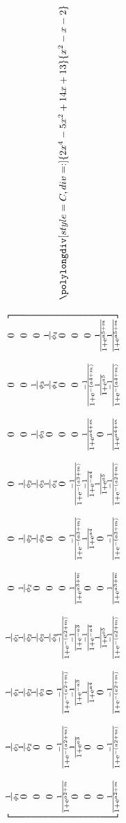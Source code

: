 \documentclass[a4paper,12pt]{article}
\begin{document}
\lipsum[2]

    \begin{equation*}
      \rotatebox{90}{$
        {\polylongdiv[style=C,div=:]{2x^4-5x^2+14x+13}{x^2-x-2}}
      $}
    \end{equation*}

    \begin{equation}
      \rotatebox{90}{$\begin{bmatrix}
          \frac{1}{\phi_1} &
          \frac{1}{\phi_1} &
          \frac{1}{\phi_1} &
          \frac{1}{\phi_1} &
          0 &
          0 &
          0 &
          0 &
          0 &
          0 \\
          0 &
          \frac{1}{\phi_2} &
          \frac{1}{\phi_2} &
          \frac{1}{\phi_2} &
          \frac{1}{\phi_2} &
          \frac{1}{\phi_2} &
          \frac{1}{\phi_2} &
          0 &
          0 &
          0 \\
          0 &
          0 &
          \frac{1}{\phi_3} &
          \frac{1}{\phi_3} &
          0 &
          \frac{1}{\phi_3} &
          \frac{1}{\phi_3} &
          \frac{1}{\phi_3} &
          \frac{1}{\phi_3} &
          0 \\
          0 &
          0 &
          0 &
          \frac{1}{\phi_4} &
          0 &
          0 &
          \frac{1}{\phi_4} &
          0 &
          \frac{1}{\phi_4} &
          \frac{1}{\phi_4} \\
          \frac{1}{1+\mathrm{e}^{a2+m}} &
          \frac{-1}{1+\mathrm{e}^{-(a2+m)}} &
          \frac{-1}{1+\mathrm{e}^{-(a2+m)}} &
          \frac{-1}{1+\mathrm{e}^{-(a2+m)}} &
          0 &
          0 &
          0 &
          0 &
          0 &
          0 \\
          0 &
          \frac{1}{1+\mathrm{e}^{a3}} &
          \frac{-1}{1+\mathrm{e}^{-a3}} &
          \frac{-1}{1+\mathrm{e}^{-a3}} &
          \frac{1}{1+\mathrm{e}^{a3+m}} &
          \frac{-1}{1+\mathrm{e}^{-(a3+m)}} &
          \frac{-1}{1+\mathrm{e}^{-(a3+m)}} &
          0 &
          0 &
          0 \\
          0 &
          0 &
          \frac{1}{1+\mathrm{e}^{a4}} &
          \frac{-1}{1+\mathrm{e}^{-a4}} &
          0 &
          \frac{1}{1+\mathrm{e}^{a4}} &
          \frac{-1}{1+\mathrm{e}^{-a4}} &
          \frac{1}{1+\mathrm{e}^{a4+m}} &
          \frac{-1}{1+\mathrm{e}^{-(a4+m)}} &
          0 \\
          0 &
          0 &
          0 &
          \frac{1}{1+\mathrm{e}^{a5}} &
          0 &
          0 &
          \frac{1}{1+\mathrm{e}^{a5}} &
          0 &
          \frac{1}{1+\mathrm{e}^{a5}} &
          \frac{1}{1+\mathrm{e}^{a5+m}} \\
          \frac{1}{1+\mathrm{e}^{a2+m}} &
          \frac{-1}{1+\mathrm{e}^{-(a2+m)}} &
          \frac{-1}{1+\mathrm{e}^{-(a2+m)}} &
          \frac{-1}{1+\mathrm{e}^{-(a2+m)}} &
          \frac{1}{1+\mathrm{e}^{a3+m}} &
          \frac{-1}{1+\mathrm{e}^{-(a3+m)}} &
          \frac{-1}{1+\mathrm{e}^{-(a2+m)}} &
          \frac{1}{1+\mathrm{e}^{a4+m}} &
          \frac{-1}{1+\mathrm{e}^{-(a4+m)}} &
          \frac{1}{1+\mathrm{e}^{a5+m}}
      \end{bmatrix}$}
  \end{equation}    

\lipsum[2]
\end{document}
